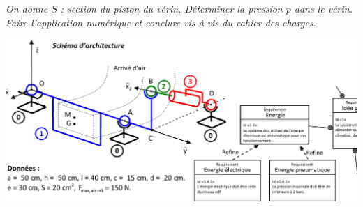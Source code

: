 \documentclass[10pt,fleqn]{article} %
\begin{document}
\begin{multicols}{2}
\subparagraph{}
\textit{On donne $S$ : section du piston du vérin. Déterminer la pression $p$ dans le vérin. Faire l’application numérique et conclure vis-à-vis du cahier des charges.}



\ifprof
\else
\end{multicols}
\fi

\begin{center}
\includegraphics[width=.95\linewidth]{images/img2}
\end{center}

\newpage
\begin{multicols}{2}

%
%
%
%
%
%
%
%
%
%
%
\end{multicols}
\end{document}
